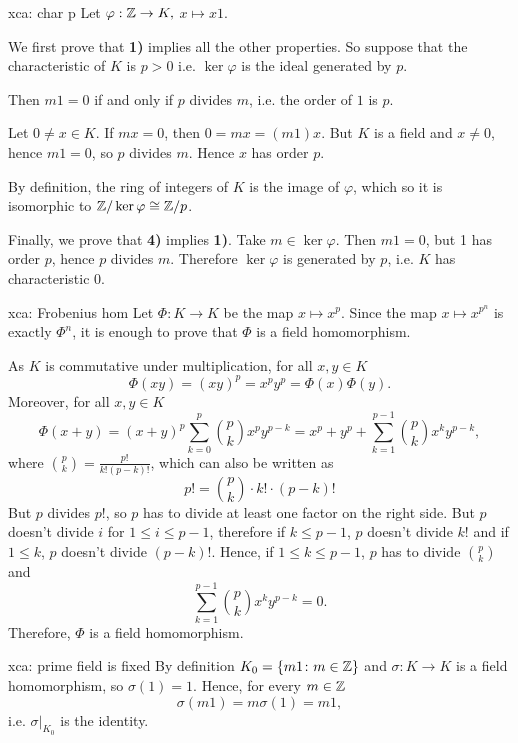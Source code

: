 \begin{sol}{xca: char p}
Let $\varphi:\mathbb{Z}\to K,$ $x\mapsto x1$.

We first prove that \textbf{1)} implies all the other 
properties. So suppose that the characteristic of $K$ is $p>0$ i.e. $\ker\varphi$ is the ideal generated by $p$. 

Then $m1=0$ if and only if $p$ divides $m$, i.e.
the order of $1$ is $p$.

Let $0\neq x\in K$. If $mx=0$, then $0=mx=(m1)x$.
But $K$ is a field and $x\neq 0$, hence $m1=0$,
so $p$ divides $m$.
Hence $x$ has order $p$.

By definition, the ring of integers of $K$ is
the image of $\varphi$, which 
so it is isomorphic to $\mathbb{Z}/\ker\varphi\cong \mathbb{Z}/p$.

Finally, we prove that \textbf{4)} implies \textbf{1)}.
Take $m\in\ker\varphi$. Then $m1=0$,
but 1 has order $p$, hence $p$ divides $m$.
Therefore $\ker\varphi$ is generated by $p$, 
i.e. $K$ has characteristic 0.
\end{sol}

\begin{sol}{xca: Frobenius hom}
Let $\Phi: K\to K$ be the map 
$x\mapsto x^{p}$.
Since the map $x\mapsto x^{p^n}$
is exactly $\Phi^n$,
it is enough to prove that $\Phi$ is a field homomorphism.

As $K$ is commutative under multiplication, 
for all $x,y \in K$ 
        \[
        \Phi(xy) = (xy)^p = x^py^p = \Phi(x) \Phi(y).
        \]
Moreover, for all $x,y \in K$ 
\[
\Phi(x+y) =
(x+y)^p \sum_{k=0}^p \binom{p}{k}x^py^{p-k}=
x^p + y^p + \sum_{k=1}^{p-1} \binom{p}{k}x^ky^{p-k} ,
\]
where $\binom{p}{k} = \frac{p!}{k!(p-k)!}$,
which can also be written as
        \[
        p! = \binom{p}{k} \cdot k! \cdot (p-k)!
        \]
But $p$ divides $p!$, so $p$
has to divide at least one 
factor on the right side. 
But $p$ doesn't divide $i$
 for $1 \leq i \leq p-1$, therefore if $k \leq p-1$, $p$ doesn't divide
$k!$ and if $1 \leq  k$, $p$ doesn't divide $(p-k)!$. 
Hence, if $1 \leq k \leq p-1$, $p$ has to divide $\binom{p}{k}$ and 
\[
\sum_{k=1}^{p-1} \binom{p}{k}x^ky^{p-k}=0.
\]
Therefore, $\Phi$ is a field homomorphism.
\end{sol}

\begin{sol}{xca: prime field is fixed}
    By definition $K_0=\{m1\colon m\in \mathbb{Z}\}$ and 
    $\sigma:K\to K$ is a field homomorphism,
    so $\sigma(1)=1$.
    Hence, for every $m\in\mathbb{Z}$
    \[
    \sigma(m1)=m\sigma(1)=m1,
    \]
    i.e. $\sigma|_{K_0}$ is the identity.
\end{sol}

